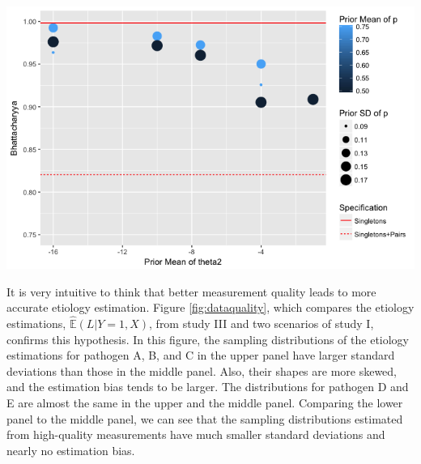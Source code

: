 \documentclass[11 pt, a4paper]{article}  %
\begin{document}
\begin{center}
\includegraphics[scale=0.6]{StudyII.png}
\label{fig:study2}
\end{center}



It is very intuitive to think that better measurement quality leads to more accurate etiology estimation. Figure \ref{fig:dataquality}, which compares the etiology estimations, $\hat{\mathbb{E}}(L|Y=1, X)$, from study III and two scenarios of study I, confirms this hypothesis. In this figure, the sampling distributions of the etiology estimations for pathogen A, B, and C in the upper panel have larger standard deviations than those in the middle panel. Also, their shapes are more skewed, and the estimation bias tends to be larger. The distributions for pathogen D and E are almost the same in the upper and the middle panel. Comparing the lower panel to the middle panel, we can see that the sampling distributions estimated from high-quality measurements have much smaller standard deviations and nearly no estimation bias.\\
\end{document}

